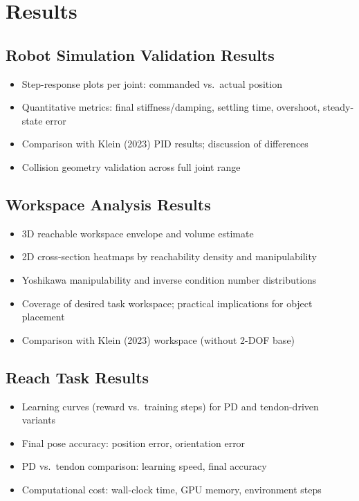 \chapter{Results}\label{ch:results}

\section{Robot Simulation Validation Results}
\begin{itemize}
    \item Step-response plots per joint: commanded vs.\ actual position
    \item Quantitative metrics: final stiffness/damping, settling time, overshoot, steady-state error
    \item Comparison with Klein (2023) PID results; discussion of differences
    \item Collision geometry validation across full joint range
\end{itemize}

\section{Workspace Analysis Results}
\begin{itemize}
    \item 3D reachable workspace envelope and volume estimate
    \item 2D cross-section heatmaps by reachability density and manipulability
    \item Yoshikawa manipulability and inverse condition number distributions
    \item Coverage of desired task workspace; practical implications for object placement
    \item Comparison with Klein (2023) workspace (without 2-DOF base)
\end{itemize}

\section{Reach Task Results}
\begin{itemize}
    \item Learning curves (reward vs.\ training steps) for PD and tendon-driven variants
    \item Final pose accuracy: position error, orientation error
    \item PD vs.\ tendon comparison: learning speed, final accuracy
    \item Computational cost: wall-clock time, GPU memory, environment steps
\end{itemize}

